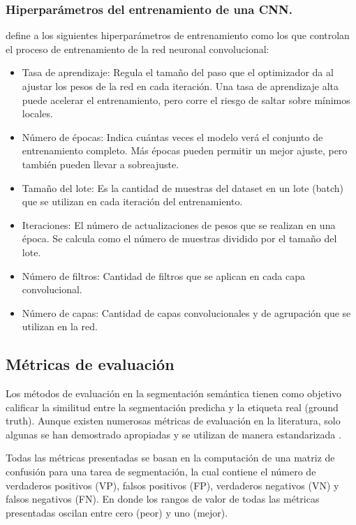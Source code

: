 \subsubsection{Hiperparámetros del entrenamiento de una CNN.}
\citet{wei_understanding_2024} define a los siguientes hiperparámetros de entrenamiento como los que controlan el proceso de entrenamiento de la red neuronal 
convolucional:
\begin{itemize}
    \item Tasa de aprendizaje: Regula el tamaño del paso que el optimizador da al ajustar los pesos de la red en cada iteración. Una tasa de aprendizaje 
    alta puede acelerar el entrenamiento, pero corre el riesgo de saltar sobre mínimos locales.
    \item Número de épocas: Indica cuántas veces el modelo verá el conjunto de entrenamiento completo. Más épocas pueden permitir un mejor ajuste, pero 
    también pueden llevar a sobreajuste.
    \item Tamaño del lote: Es la cantidad de muestras del dataset en un lote (batch) que se utilizan en cada iteración del entrenamiento.
    \item Iteraciones: El número de actualizaciones de pesos que se realizan en una época. Se calcula como el número de muestras dividido por el tamaño del lote.
    \item Número de filtros: Cantidad de filtros que se aplican en cada capa convolucional.
    \item Número de capas: Cantidad de capas convolucionales y de agrupación que se utilizan en la red.
\end{itemize}

\subsection{Métricas de evaluación}
\label{sec:metricas_evaluacion}
Los métodos de evaluación en la segmentación semántica tienen como objetivo calificar la similitud entre la segmentación predicha y la etiqueta real (ground truth). Aunque existen numerosas métricas de evaluación en la literatura, solo 
algunas se han demostrado apropiadas y se utilizan de manera estandarizada \citep{muller_towards_2022}.

Todas las métricas presentadas se basan en la computación de una matriz de confusión para una tarea de segmentación, la cual 
contiene el número de verdaderos positivos (VP), falsos positivos (FP), verdaderos negativos (VN) y falsos negativos (FN). En donde 
los rangos de valor de todas las métricas presentadas oscilan entre cero (peor) y uno (mejor).

